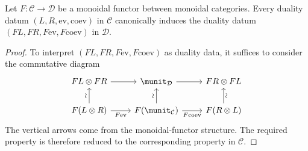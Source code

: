 \begin{proposition}\label{prop:monoidal-functor-dual}
	Let $F:\mathcal{C}\to\mathcal{D}$ be a monoidal functor between monoidal
	categories. Every duality datum
	$(L,R,\mathrm{ev},\mathrm{coev})$ in $\mathcal{C}$ canonically induces
	the duality datum $(FL,FR,F\mathrm{ev},F\mathrm{coev})$ in $\mathcal{D}$.
\end{proposition}
\begin{proof}
	To interpret $(FL,FR,F\mathrm{ev},F\mathrm{coev})$ as duality data, it
	suffices to consider the commutative diagram
	\[\begin{tikzcd}
		FL \otimes FR \arrow[r] & \munit_{\mathcal{D}} \arrow[r] & FR \otimes FL \\
		F(L \otimes R) \arrow[r, "{F\mathrm{ev}}"'] \arrow[u, "\sim" sloped] & F(\munit_{\mathcal{C}}) \arrow[u, "\sim" sloped] \arrow[r, "{F\mathrm{coev}}"'] & F(R \otimes L) \arrow[u, "\sim"' sloped]
	\end{tikzcd}\]
	The vertical arrows come from the monoidal-functor structure. The required
	property is therefore reduced to the corresponding property in
	$\mathcal{C}$.
\end{proof}

